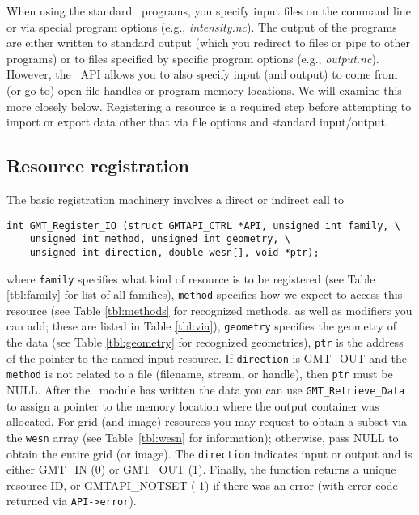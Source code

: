 \documentclass[11pt]{report}
\begin{document}
When using the standard \GMT\ programs, you specify input files on
the command line or via special program options (e.g., \emph{intensity.nc}). The output of
the programs are either written to standard output (which you redirect to files or pipe to other programs)
or to files specified by specific program options (e.g., \emph{output.nc}).  However, the
\GMT\ API allows you to also specify input (and output) to come from (or go to) open file handles
or program memory locations.  We will examine this more closely below.  Registering a
resource is a required step before attempting to import or export data other that via file options
and standard input/output.

\subsection{Resource registration}
The basic registration machinery involves a direct or indirect call to

\begin{verbatim}
int GMT_Register_IO (struct GMTAPI_CTRL *API, unsigned int family, \
    unsigned int method, unsigned int geometry, \
    unsigned int direction, double wesn[], void *ptr);
\end{verbatim}
where \texttt{family} specifies what kind of resource is to be registered
(see Table \ref{tbl:family} for list of all families), \texttt{method} specifies
how we expect to access this resource (see Table \ref{tbl:methods} for recognized methods,
as well as modifiers you can add; these are listed in Table \ref{tbl:via}),
\texttt{geometry} specifies
the geometry of the data (see Table \ref{tbl:geometry} for recognized geometries),
\texttt{ptr} is the address of the pointer to the named input resource.  If \texttt{direction}
is GMT\_OUT and the \texttt{method} is not related to a file (filename, stream, or handle),
then \texttt{ptr} must be NULL.  After the \GMT\ module has written the data you can use
\texttt{GMT\_Retrieve\_Data} to assign a pointer to the memory location where the output container was allocated.
For grid (and image) resources you may request to obtain a subset via the \texttt{wesn}
array (see Table~\ref{tbl:wesn} for information); otherwise, pass NULL to obtain the entire grid (or image).
The \texttt{direction} indicates input or output and is either GMT\_IN (0) or GMT\_OUT (1).
Finally, the function returns a unique resource ID, or GMTAPI\_NOTSET (-1) if there was an
error (with error code returned via \texttt{API->error}).
\end{document}
